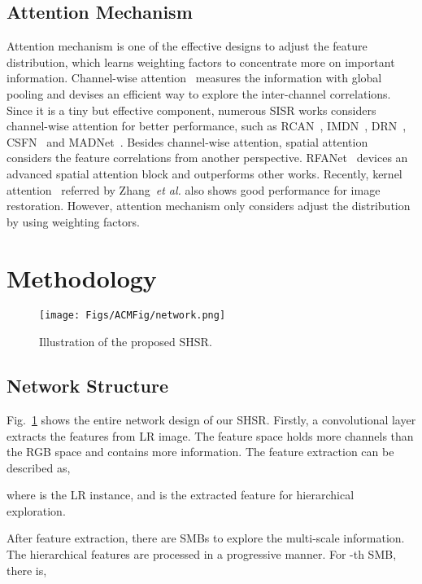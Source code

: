 \documentclass[manuscript,screen]{acmart}
\begin{document}
\subsection{Attention Mechanism}
Attention mechanism is one of the effective designs to adjust the feature distribution, which learns weighting factors to concentrate more on important information. Channel-wise attention~\cite{senet_pami2020} measures the information with global pooling and devises an efficient way to explore the inter-channel correlations. Since it is a tiny but effective component, numerous SISR works considers channel-wise attention for better performance, such as RCAN~\cite{rcan_eccv2018}, IMDN~\cite{imdn_mm2019}, DRN~\cite{drn_cvpr2020}, CSFN~\cite{csfm_csvt2020} and MADNet~\cite{madnet_tcyb2020}. Besides channel-wise attention, spatial attention considers the feature correlations from another perspective. RFANet~\cite{rfanet_cvpr2020} devices an advanced spatial attention block and outperforms other works. Recently, kernel attention~\cite{kam_tomm2020} referred by Zhang~\textit{et al.} also shows good performance for image restoration. However, attention mechanism only considers adjust the distribution by using weighting factors.

\section{Methodology}

\begin{figure}[t]
	\centering
	\texttt{[image: Figs/ACMFig/network.png]}
	\caption{Illustration of the proposed SHSR.}
	\label{fig:network}
\end{figure}

\subsection{Network Structure}
Fig.~\ref{fig:network} shows the entire network design of our SHSR. Firstly, a convolutional layer extracts the features from LR image. The feature space holds more channels than the RGB space and contains more information. The feature extraction can be described as,

where  is the LR instance, and  is the extracted feature for hierarchical exploration.

After feature extraction, there are SMBs to explore the multi-scale information. The hierarchical features are processed in a progressive manner. For -th SMB, there is,
\end{document}
